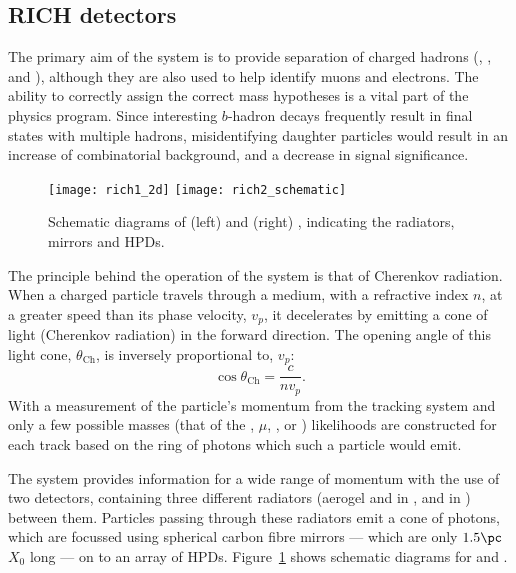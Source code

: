 \subsection{RICH detectors}

The primary aim of the \lhcb \rich system is to provide \pid separation of charged hadrons (\pion,
\kaon, and \proton),
although they are also used to help identify muons and electrons.
The ability to correctly assign the correct mass hypotheses is a vital part of the \lhcb physics
program.
Since interesting $b$-hadron decays frequently result in final states with multiple hadrons,
misidentifying daughter particles would result in an increase of combinatorial background, and
a decrease in signal significance.

\begin{figure}
  \begin{center}
    \texttt{[image: rich1\_2d]}
    \texttt{[image: rich2\_schematic]}
    \caption[Diagram of the LHCb RICH detectors]
    {
      Schematic diagrams of (left) \richone and (right) \richtwo, indicating the radiators,
      mirrors and HPDs.
    }
    \label{fig:lhcb:rich}
  \end{center}
\end{figure}

The principle behind the operation of the \rich system is that of Cherenkov radiation.
When a charged particle travels through a medium, with a refractive index $n$, at a greater speed
than its phase velocity, $v_p$, it decelerates by emitting a cone of light (Cherenkov radiation) in
the forward direction.
The opening angle of this light cone, $\theta_\mathrm{Ch}$, is inversely proportional to, $v_p$:
\begin{equation}
  \cos\theta_\mathrm{Ch}=\frac{c}{nv_p}.
\end{equation}
With a measurement of the particle's momentum from the tracking system and only a few possible
masses (that of the \electron, $\mu$, \pion, \kaon or \proton) likelihoods are constructed for each
track based on the ring of photons which such a particle would emit.

The \lhcb \rich system provides \pid information for a wide range of momentum with the use of two \rich
detectors, containing three different radiators (aerogel and \cfourften in
\richone, and \cffour in \richtwo) between them.
Particles passing through these radiators emit a cone of photons, which are focussed using
spherical carbon fibre mirrors --- which are only $1.5\pc$ $X_0$ long --- on to an array of
\glspl{HPD}.
Figure~\ref{fig:lhcb:rich} shows schematic diagrams for \richone and \richtwo.

